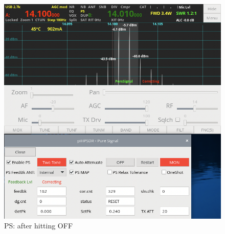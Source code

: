 \documentclass[12pt]{book}
\begin{document}
\begin{figure}[t!]
\center
\includegraphics[scale=0.45]{PSoff.png}
\caption{PS: after hitting OFF}
\label{fig:PSoff}
\end{figure}
\end{document}
